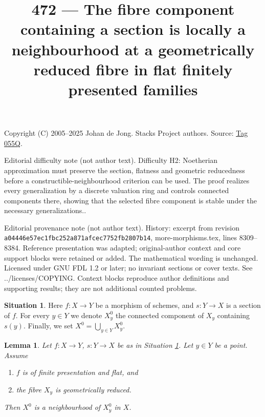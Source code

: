 \documentclass{amsart}
\theoremstyle{plain}
\newtheorem{lemma}[subsection]{Lemma}
\theoremstyle{definition}
\newtheorem{situation}[subsection]{Situation}
\theoremstyle{remark}
\numberwithin{equation}{subsection}
\begin{document}
\title[Stacks Project, Tag 055Q]{472 --- The fibre component containing a section is locally a neighbourhood at a geometrically reduced fibre in flat finitely presented families}
\maketitle
\noindent Copyright (C) 2005--2025 Johan de Jong. Stacks Project authors. Source: \href{https://stacks.math.columbia.edu/tag/055Q}{Tag 055Q}.

\noindent Editorial difficulty note (not author text). Difficulty H2: Noetherian approximation must preserve the section, flatness and geometric reducedness before a constructible-neighbourhood criterion can be used. The proof realizes every generalization by a discrete valuation ring and controls connected components there, showing that the selected fibre component is stable under the necessary generalizations..

\noindent Editorial provenance note (not author text). History: excerpt from revision \texttt{a0444\allowbreak 6e57e\allowbreak c1fbc\allowbreak 252a8\allowbreak 71afc\allowbreak ec775\allowbreak 2fb28\allowbreak 07b14}, more-morphisms.tex, lines 8309--8384. Reference presentation was adapted; original-author context and core support blocks were retained or added. The mathematical wording is unchanged. Licensed under GNU FDL 1.2 or later; no invariant sections or cover texts. See ../licenses/COPYING. Context blocks reproduce author definitions and supporting results; they are not additional counted problems.

\begin{situation}
\label{situation-connected-along-section}
Here $f : X \to Y$ be a morphism of schemes, and
$s : Y \to X$ is a section of $f$.
For every $y \in Y$ we denote $X^0_y$ the connected component of $X_y$
containing $s(y)$. Finally, we set $X^0 = \bigcup_{y \in Y} X^0_y$.
\end{situation}

\begin{lemma}
\label{lemma-connected-along-section-open-neighbourhood}
Let $f : X \to Y$, $s : Y \to X$ be as in
Situation \ref{situation-connected-along-section}.
Let $y \in Y$ be a point.
Assume
\begin{enumerate}
\item $f$ is of finite presentation and flat, and
\item the fibre $X_y$ is geometrically reduced.
\end{enumerate}
Then $X^0$ is a neighbourhood of $X^0_y$ in $X$.
\end{lemma}
\end{document}
